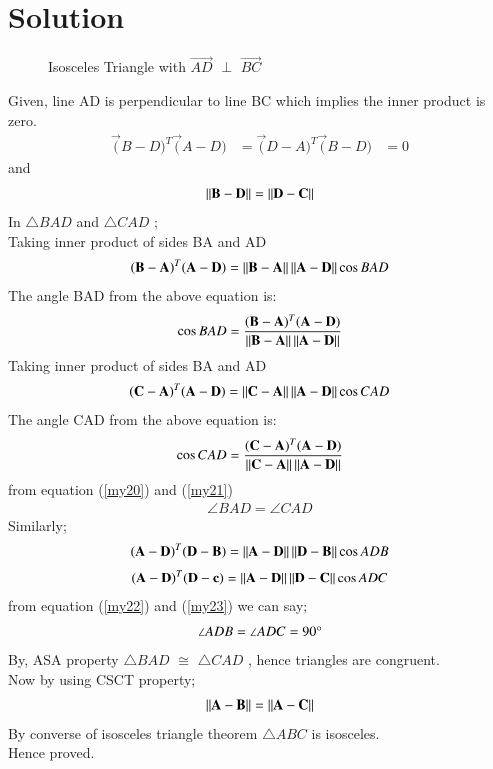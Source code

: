 \documentclass[journal,12pt,twocolumn]{IEEEtran}
\begin{document}
\section{Solution}
\renewcommand{\thefigure}{1}
\begin{figure}[!ht]
\centering
\resizebox{\columnwidth}{!}{}
\caption{Isosceles Triangle with $\vec{AD}$  $\perp$ $\vec{BC}$}
\label{fig:tri_right_angle}
\end{figure}
Given,
   line AD is perpendicular to line BC which implies the inner product is zero.  
\begin{align}
\vec(B-D)^T \vec(A-D) &= \vec(D-A)^T \vec(B-D)&= 0
\end{align}
and 
\begin{align}
     \left\lVert\mathbf{B-D}\right\rVert = \left\lVert\mathbf{D-C}\right\rVert
\end{align}
In $\triangle{BAD}$ and $\triangle{CAD}$ ;\\
Taking inner product of sides BA and AD
\begin{align}
 (\mathbf{B}-\mathbf{A})^T(\mathbf{A}-\mathbf{D}) =
    \left\lVert\mathbf{B}-\mathbf{A}\right\rVert\left\lVert\mathbf{A}-\mathbf{D}\right\rVert\cos{BAD}
\end{align}
The angle BAD from the  above equation is:
\begin{align}\label{my20}
     \cos{BAD} = \frac{(\mathbf{B}-\mathbf{A})^T(\mathbf{A}-\mathbf{D})}{\left\lVert\mathbf{B}-\mathbf{A}\right\rVert\left\lVert\mathbf{A}-\mathbf{D}\right\rVert} 
     \end{align}
Taking inner product of sides BA and AD
\begin{align}
 (\mathbf{C}-\mathbf{A})^T(\mathbf{A}-\mathbf{D}) =
    \left\lVert\mathbf{C}-\mathbf{A}\right\rVert\left\lVert\mathbf{A}-\mathbf{D}\right\rVert\cos{CAD}
    \end{align}
    The angle CAD from the  above equation is:
\begin{align}\label{my21}
     \cos{CAD} = \frac{(\mathbf{C}-\mathbf{A})^T(\mathbf{A}-\mathbf{D})}{\left\lVert\mathbf{C}-\mathbf{A}\right\rVert\left\lVert\mathbf{A}-\mathbf{D}\right\rVert} 
     \end{align}
from equation (\ref{my20}) and (\ref{my21})\\
\begin{align}
\angle {BAD}=\angle {CAD}
\end{align}
%
Similarly;
\begin{align}\label{my22}
 (\mathbf{A}-\mathbf{D})^T(\mathbf{D}-\mathbf{B}) =
    \left\lVert\mathbf{A}-\mathbf{D}\right\rVert\left\lVert\mathbf{D}-\mathbf{B}\right\rVert\cos{ADB}
    \end{align}
%
\begin{align}\label{my23}
    (\mathbf{A}-\mathbf{D})^T(\mathbf{D}-\mathbf{c}) =
    \left\lVert\mathbf{A}-\mathbf{D}\right\rVert\left\lVert\mathbf{D}-\mathbf{C}\right\rVert\cos{ADC}
    \end{align}
%
from equation (\ref{my22}) and (\ref{my23}) we can say;
\begin{align}
    \angle {ADB}=\angle {ADC}=90\degree
    \end{align}
%
By, ASA property $\triangle{BAD}$ $\cong$ $\triangle{CAD}$ ,
hence triangles are congruent. \\ 
Now by using CSCT property;\\
%
\begin{align}
\left\lVert\mathbf{A-B}\right\rVert = \left\lVert\mathbf{A-C}\right\rVert 
\end{align}
%
By converse of isosceles triangle theorem $\triangle{ABC}$ is isosceles.\\
Hence proved.
\end{document}
